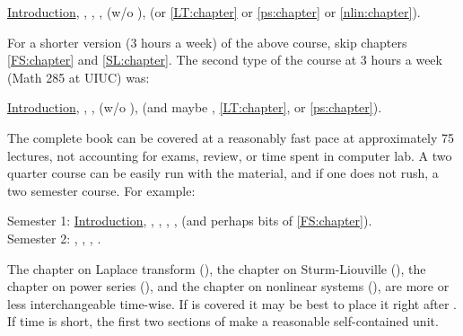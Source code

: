 \medskip

\noindent
\hyperref[intro:chapter]{Introduction},
,
,
,
 (w/o ),
 (or
\ref{LT:chapter} or \ref{ps:chapter} or \ref{nlin:chapter}).

\medskip

For a shorter version (3 hours a week) of the above course, skip
chapters \ref{FS:chapter} and \ref{SL:chapter}.
The second type of the course at 3 hours a week (Math 285 at UIUC) was:

\medskip

\noindent
\hyperref[intro:chapter]{Introduction},
,
,
 (w/o ),
(and maybe ,
\ref{LT:chapter}, or \ref{ps:chapter}).

\medskip

The complete book can be covered at a reasonably
fast pace at approximately 75 lectures,
not accounting for exams, review,
or time spent in computer lab. %
A two quarter course can be easily run with the material,
and if one does not rush, a two semester course.  For example:

\medskip

\noindent
Semester 1:
\hyperref[intro:chapter]{Introduction},
,
,
,
, (and perhaps bits of \ref{FS:chapter}).
\\
Semester 2: 
,
,
,
.

\medskip

%

The chapter on
Laplace transform (),
the chapter on Sturm-Liouville (),
the chapter on power series (),
and the chapter on nonlinear systems (),
are more or less interchangeable time-wise.
If  is covered it may be best to place it right 
after .
If time is short, the first two sections of
 make a reasonable self-contained unit.

